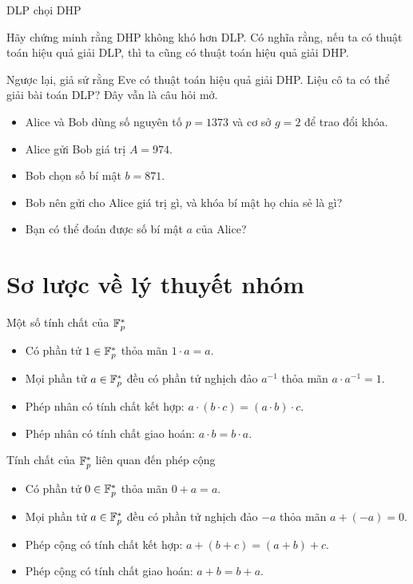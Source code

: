 \begin{frame}{DLP  chọi DHP }
  \begin{xrcs}
    Hãy chứng minh rằng DHP  không khó hơn DLP.  Có nghĩa rằng, nếu ta có thuật toán hiệu quả giải DLP, thì ta cũng có thuật toán hiệu quả giải DHP.
  \end{xrcs}\pause 
  \begin{rmrk}
    Ngược lại, giả sử rằng Eve có thuật toán hiệu quả giải DHP. Liệu cô ta có thể giải bài toán DLP? Đây vẫn là câu hỏi mở.
  \end{rmrk}
\end{frame}
\begin{frame}
  \begin{xrcs}
    \begin{itemize}
    \item<+-> Alice và Bob dùng số nguyên tố $p = 1373$ và cơ sở $g=2$ để
      trao đổi khóa. 
    \item<+-> Alice gửi Bob giá trị $A=974$.
    \item<+-> Bob chọn số bí mật $b = 871$.
    \item<+-> Bob nên gửi cho Alice giá trị gì, và khóa bí mật họ chia sẻ là gì?
    \item<+-> Bạn có thể đoán được số bí mật $a$ của Alice?
    \end{itemize}
  \end{xrcs}
\end{frame}

\section{Sơ lược về lý thuyết nhóm}
\begin{frame}{Một số tính chất của $\mathbb{F}_p^*$}
	\begin{itemize}
		\item<+-> Có phần tử $1 \in \mathbb{F}_p^*$ thỏa mãn $1 \cdot a =  a$.
		\item<+-> Mọi phần tử $a \in \mathbb{F}_p^*$ đều có phần tử nghịch đảo $a^{-1}$ thỏa mãn $a\cdot a^{-1} = 1$.
		\item<+-> Phép nhân có tính chất kết hợp: $a \cdot (b\cdot c) = (a \cdot b)\cdot c $.
		\item<+-> Phép nhân có tính chất giao hoán: $a \cdot b = b \cdot a$.   
	\end{itemize}
\end{frame}

\begin{frame}{Tính chất của $\mathbb{F}_p^*$ liên quan đến phép cộng}
	\begin{itemize}
		\item<+-> Có phần tử $0 \in \mathbb{F}_p^*$ thỏa mãn $0 +  a =  a$.
		\item<+-> Mọi phần tử $a \in \mathbb{F}_p^*$ đều có phần tử nghịch đảo $-a$ thỏa mãn $a + (-a) = 0$.
		\item<+-> Phép cộng có tính chất kết hợp: $a + (b + c) = (a + b)+ c $.
		\item<+-> Phép cộng có tính chất giao hoán: $a + b = b + a$.   
	\end{itemize}
\end{frame}

